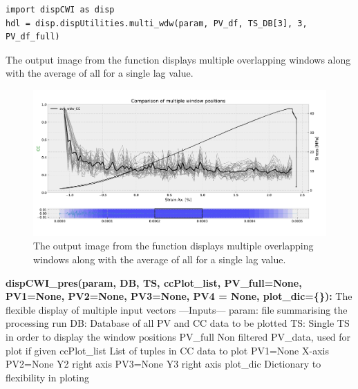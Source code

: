 \documentclass{article}
\begin{document}
\begin{lstlisting}[basicstyle=\small, frame=single]
import dispCWI as disp
hdl = disp.dispUtilities.multi_wdw(param, PV_df, TS_DB[3], 3, PV_df_full)
\end{lstlisting}

The output image from the function displays multiple overlapping windows along with the average of all for a single lag value.

\begin{figure}[hbt]
  \includegraphics[width=150mm,scale=0.6]{Multi_wdw}
  \caption{The output image from the function displays multiple overlapping windows along with the average of all for a single lag value.}
\end{figure}

		\textbf{dispCWI\_pres(param, DB, TS, ccPlot\_list, PV\_full=None, PV1=None, PV2=None, PV3=None, PV4 = None, plot\_dic=\{\}):} \newline
        The flexible display of multiple input vectors\newline
        ---Inputs---
        param:       file summarising the processing run\newline
        DB:          Database of all PV and CC data to be plotted\newline
        TS:          Single TS in order to display the window positions\newline
        PV\_full    Non filtered PV\_data, used for plot if given\newline
        ccPlot\_list  List of tuples in CC data to plot \newline
        PV1=None     X-axis\newline
        PV2=None     Y2 right axis\newline
        PV3=None     Y3 right axis\newline
        plot\_dic    Dictionary to flexibility in ploting
        \newline
        
\end{document}
